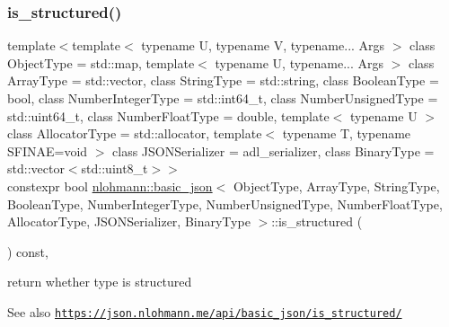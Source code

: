 \subsubsection{\texorpdfstring{is\+\_\+structured()}{is\_structured()}}
{\footnotesize\ttfamily template$<$template$<$ typename U, typename V, typename... Args $>$ class Object\+Type = std\+::map, template$<$ typename U, typename... Args $>$ class Array\+Type = std\+::vector, class String\+Type  = std\+::string, class Boolean\+Type  = bool, class Number\+Integer\+Type  = std\+::int64\+\_\+t, class Number\+Unsigned\+Type  = std\+::uint64\+\_\+t, class Number\+Float\+Type  = double, template$<$ typename U $>$ class Allocator\+Type = std\+::allocator, template$<$ typename T, typename S\+F\+I\+N\+A\+E=void $>$ class J\+S\+O\+N\+Serializer = adl\+\_\+serializer, class Binary\+Type  = std\+::vector$<$std\+::uint8\+\_\+t$>$$>$ \\
constexpr bool \hyperlink{classnlohmann_1_1basic__json}{nlohmann\+::basic\+\_\+json}$<$ Object\+Type, Array\+Type, String\+Type, Boolean\+Type, Number\+Integer\+Type, Number\+Unsigned\+Type, Number\+Float\+Type, Allocator\+Type, J\+S\+O\+N\+Serializer, Binary\+Type $>$\+::is\+\_\+structured (\begin{DoxyParamCaption}{ }\end{DoxyParamCaption}) const\hspace{0.3cm}{\ttfamily [inline]}, {\ttfamily [noexcept]}}



return whether type is structured 

\begin{DoxySeeAlso}{See also}
\href{https://json.nlohmann.me/api/basic_json/is_structured/}{\tt https\+://json.\+nlohmann.\+me/api/basic\+\_\+json/is\+\_\+structured/} 
\end{DoxySeeAlso}
\mbox{\label{classnlohmann_1_1basic__json_a916a6ba75ec7624e9c6c977a52d6fd17}} 
